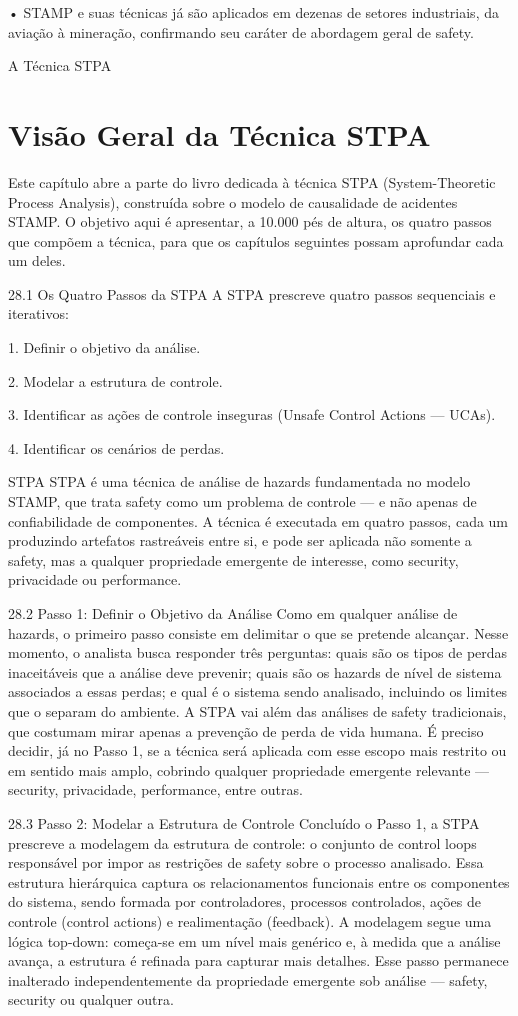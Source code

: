 • STAMP e suas técnicas já são aplicados em dezenas de setores industriais, da aviação à mineração, confirmando seu caráter de abordagem geral de safety.

A Técnica STPA

\chapter{Visão Geral da Técnica STPA}

Este capítulo abre a parte do livro dedicada à técnica STPA (System-Theoretic Process Analysis), construída sobre o modelo de causalidade de acidentes STAMP. O objetivo aqui é apresentar, a 10.000 pés de altura, os quatro passos que compõem a técnica, para que os capítulos seguintes possam aprofundar cada um deles.

28.1 Os Quatro Passos da STPA A STPA prescreve quatro passos sequenciais e iterativos:

1. Definir o objetivo da análise.

2. Modelar a estrutura de controle.

3. Identificar as ações de controle inseguras (Unsafe Control Actions — UCAs).

4. Identificar os cenários de perdas.

STPA STPA é uma técnica de análise de hazards fundamentada no modelo STAMP, que trata safety como um problema de controle — e não apenas de confiabilidade de componentes. A técnica é executada em quatro passos, cada um produzindo artefatos rastreáveis entre si, e pode ser aplicada não somente a safety, mas a qualquer propriedade emergente de interesse, como security, privacidade ou performance.

28.2 Passo 1: Definir o Objetivo da Análise Como em qualquer análise de hazards, o primeiro passo consiste em delimitar o que se pretende alcançar. Nesse momento, o analista busca responder três perguntas: quais são os tipos de perdas inaceitáveis que a análise deve prevenir; quais são os hazards de nível de sistema associados a essas perdas; e qual é o sistema sendo analisado, incluindo os limites que o separam do ambiente. A STPA vai além das análises de safety tradicionais, que costumam mirar apenas a prevenção de perda de vida humana. É preciso decidir, já no Passo 1, se a técnica será aplicada com esse escopo mais restrito ou em sentido mais amplo, cobrindo qualquer propriedade emergente relevante — security, privacidade, performance, entre outras.

28.3 Passo 2: Modelar a Estrutura de Controle Concluído o Passo 1, a STPA prescreve a modelagem da estrutura de controle: o conjunto de control loops responsável por impor as restrições de safety sobre o processo analisado. Essa estrutura hierárquica captura os relacionamentos funcionais entre os componentes do sistema, sendo formada por controladores, processos controlados, ações de controle (control actions) e realimentação (feedback). A modelagem segue uma lógica top-down: começa-se em um nível mais genérico e, à medida que a análise avança, a estrutura é refinada para capturar mais detalhes. Esse passo permanece inalterado independentemente da propriedade emergente sob análise — safety, security ou qualquer outra.

